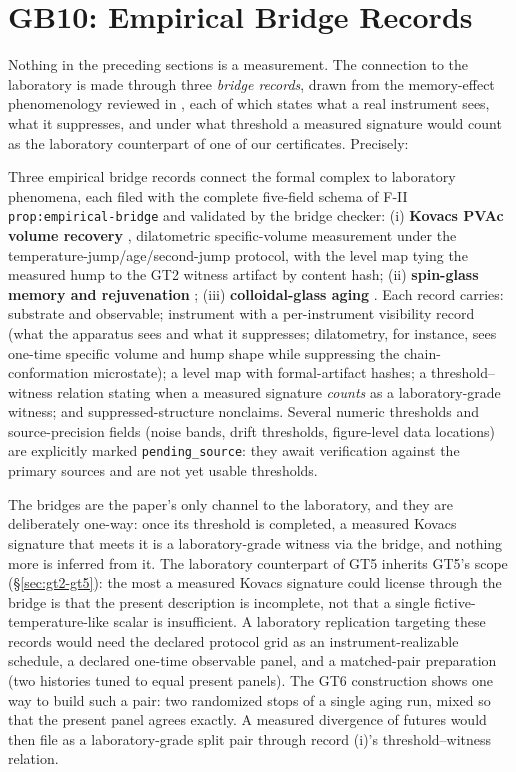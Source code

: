 \section{GB10: Empirical Bridge Records}
\label{sec:bridges}

Nothing in the preceding sections is a measurement. The connection to the laboratory is made
through three \emph{bridge records}, drawn from the memory-effect phenomenology reviewed in
\cite{keim-2019}, each of which states what a real instrument sees, what it
suppresses, and under what threshold a measured signature would count as the laboratory
counterpart of one of our certificates. Precisely:

Three empirical bridge records connect the formal complex to laboratory phenomena, each filed with
the complete five-field schema of F-II \texttt{prop:empirical-bridge} and validated by the bridge
checker: (i) \textbf{Kovacs PVAc volume recovery}
\cite{kovacs-1963,struik-1978,simon-sobieski-plazek-2001,bernazzani-simon-2002}, dilatometric
specific-volume measurement under the temperature-jump/age/second-jump protocol, with the level
map tying the measured hump to the GT2 witness artifact by content hash; (ii)
\textbf{spin-glass memory and rejuvenation}
\cite{jonason-et-al-1998,bouchaud-dupuis-hammann-vincent-2001,vincent-2007}; (iii) \textbf{colloidal-glass aging}
\cite{weeks-et-al-2000,courtland-weeks-2003,cipelletti-ramos-2005,peng-mckenna-2016}. Each record
carries: substrate and observable; instrument with a per-instrument visibility record (what the
apparatus sees and what it suppresses; dilatometry, for instance, sees one-time specific volume
and hump shape while suppressing the chain-conformation microstate); a level map with
formal-artifact hashes; a threshold--witness relation stating when a measured signature
\emph{counts} as a laboratory-grade witness; and suppressed-structure nonclaims. Several numeric
thresholds and source-precision fields (noise bands, drift thresholds, figure-level data
locations) are explicitly marked \texttt{pending\_source}: they await verification against the
primary sources and are not yet usable thresholds.

The bridges are the paper's only channel to the laboratory, and they are deliberately one-way:
once its threshold is completed, a measured Kovacs signature that meets it is a laboratory-grade
witness via the bridge, and nothing more is inferred from it. The laboratory counterpart of GT5
inherits GT5's scope (\S\ref{sec:gt2-gt5}): the most a measured Kovacs signature could license
through the bridge is that the present description is incomplete, not that a single
fictive-temperature-like scalar is insufficient.
A laboratory replication targeting these records would need the declared protocol grid as an
instrument-realizable schedule, a declared one-time observable panel, and a matched-pair
preparation (two histories tuned to equal present panels). The GT6 construction shows one way to
build such a pair: two randomized stops of a single aging run, mixed so that the present panel
agrees exactly. A measured divergence of futures would
then file as a laboratory-grade split pair through record (i)'s threshold--witness relation.

